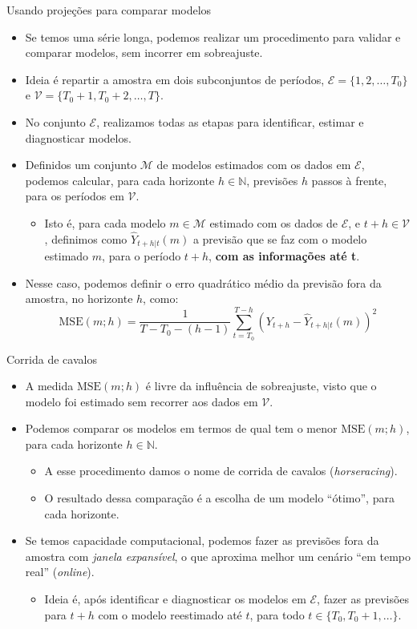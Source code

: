 \documentclass[11pt]{beamer}
\begin{document}
\begin{frame}{Usando projeções para comparar modelos}
\begin{itemize}
	\item Se temos uma série longa, podemos realizar um procedimento para validar e comparar modelos, sem incorrer em sobreajuste.
	\item Ideia é repartir a amostra em dois subconjuntos de períodos, $\mathcal{E} = \{1,2,\ldots,T_0\}$ e $\mathcal{V} = \{T_0+1,T_0+2,\ldots, T\}$.
	\item No conjunto $\mathcal{E}$, realizamos todas as etapas para identificar, estimar e diagnosticar modelos.
	\item Definidos um conjunto $ \mathcal{M}$ de modelos estimados com os dados em $ \mathcal{E}$, podemos calcular, para cada horizonte $h \in \mathbb{N}$, previsões $h$ passos à frente, para os períodos em $\mathcal{V}$.
	\begin{itemize}
 	\item Isto é, para cada modelo $m \in \mathcal{M}$ estimado com os dados de $\mathcal{E}$, e $t+h \in \mathcal{V}$, definimos como $\hat{Y}_{t+h|t}(m)$ a previsão que se faz com o modelo estimado $m$, para o período $t+h$, \textbf{com as informações até t}.
	\end{itemize}

	\item Nesse caso, podemos definir o erro quadrático médio da previsão fora da amostra, no horizonte $h$, como:
	$$\text{MSE}(m;h) =  \frac{1}{T-T_0-(h-1)}\sum_{t=T_0}^{T-h} (Y_{t+h} - \hat{Y}_{t+h|t}(m))^2$$
	
\end{itemize}
\end{frame}
\begin{frame}{Corrida de cavalos}
	\begin{itemize}
		\item A medida 	$\text{MSE}(m;h)$ é livre da influência de sobreajuste, visto que o modelo foi estimado sem recorrer aos dados em $\mathcal{V}$.
		\item Podemos comparar os modelos em termos de qual tem o menor $\text{MSE}(m;h)$, para cada horizonte $h \in \mathbb{N}$.
		\begin{itemize}
			\item A esse procedimento damos o nome de corrida de cavalos (\textit{horseracing}).
			\item O resultado dessa comparação é a escolha de um modelo ``ótimo'', para cada horizonte.
		\end{itemize}
		\item Se temos capacidade computacional, podemos fazer as previsões fora da amostra com \emph{janela expansível}, o que aproxima melhor um cenário ``em tempo real'' (\textit{online}).
		\begin{itemize}
			\item Ideia é, após identificar e diagnosticar os modelos em $\mathcal{E}$, fazer as previsões para $t+h$ com o modelo reestimado até $t$, para todo $t \in \{T_0,T_0+1, \ldots\}$.
		\end{itemize}
	\end{itemize}
\end{frame}
\end{document}
